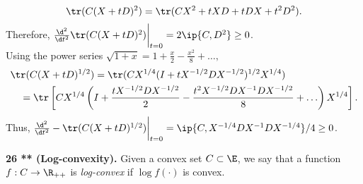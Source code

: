 \documentclass[../borwein-lewis_notes.tex]{subfiles}
\begin{document}
\begin{enumerate}[(a)]
{\begin{equation*}
\tr(C(X+tD)^2) = \tr(CX^2 + tXD + tDX + t^2 D^2).
\end{equation*}
Therefore, $\frac{\d^2}{\d t^2}\tr(C(X+tD)^2)\bigg|_{t=0} = 2\ip{C, D^2}
\geq 0$. \\
Using the power series $\sqrt{1+x} = 1 + \frac{x}{2} - \frac{x^2}{8} 
+ \ldots,$
\begin{align*}
&\tr(C(X+tD)^{1/2}) = \tr(CX^{1/4}(I + tX^{-1/2}DX^{-1/2})^{1/2}X^{1/4})\\
&\quad = \tr\left[CX^{1/4}\left(I + \frac{tX^{-1/2}DX^{-1/2}}{2} 
- \frac{t^2 X^{-1/2}DX^{-1}DX^{-1/2}}{8}+\ldots\right)X^{1/4}\right].
\end{align*}
Thus, $\frac{\d^2}{\d t^2}-\tr(C(X+tD)^{1/2})\bigg|_{t=0} = 
\ip{C, X^{-1/4}DX^{-1}DX^{-1/4}}/4 \geq 0$.
}
\end{enumerate}
\noindent
\textbf{26 ** (Log-convexity).} Given a convex set $C\subset\E$, we 
say that a function $f: C\to\R_{++}$ is \textit{log-convex} if 
$\log f(\cdot)$ is convex.
\end{document}
